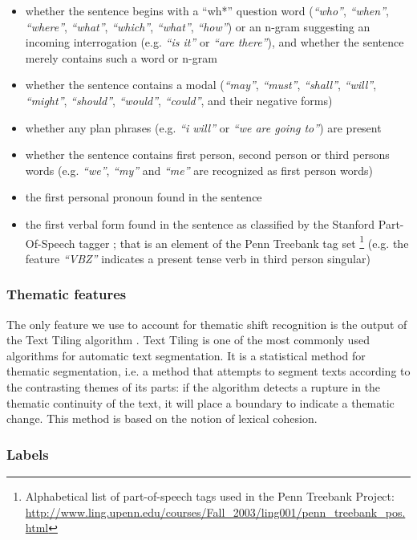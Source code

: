 \begin{itemize}
	\item whether the sentence begins with a ``wh*'' question word  (\textit{``who''}, \textit{``when''}, \textit{``where''}, \textit{``what''}, \textit{``which''}, \textit{``what''}, \textit{``how''}) or an n-gram suggesting an incoming interrogation (e.g. \textit{``is it''} or \textit{``are there''}), and whether the sentence merely contains such a word or n-gram
	\item whether the sentence contains a modal (\textit{``may''}, \textit{``must''}, \textit{``shall''}, \textit{``will''}, \textit{``might''}, \textit{``should''}, \textit{``would''}, \textit{``could''}, and their negative forms)
	\item whether any plan phrases (e.g. \textit{``i will''} or \textit{``we are going to''}) are present
	\item whether the sentence contains first person, second person or third persons words (e.g. \textit{``we''}, \textit{``my''} and \textit{``me''} are recognized as first person words)
	\item the first personal pronoun found in the sentence
	\item the first verbal form found in the sentence as classified by the Stanford Part-Of-Speech tagger ; that is an element of the Penn Treebank tag set \footnote{Alphabetical list of part-of-speech tags used in the Penn Treebank Project: \url{http://www.ling.upenn.edu/courses/Fall_2003/ling001/penn_treebank_pos.html}} (e.g. the feature \textit{``VBZ''} indicates a present tense verb in third person singular)
\end{itemize}

\subsubsection{Thematic features}

The only feature we use to account for thematic shift recognition is the output of the Text Tiling algorithm \cite{hearst1997texttiling}. Text Tiling is one of the most commonly used algorithms for automatic text segmentation. It is a statistical method for thematic segmentation, i.e. a method that attempts to segment texts according to the contrasting themes of its parts: if the algorithm detects a rupture in the thematic continuity of the text, it will place a boundary to indicate a thematic change. This method is based on the notion of lexical cohesion.

\subsubsection{Labels}

